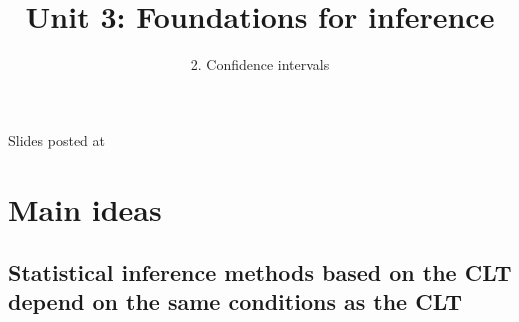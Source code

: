 \documentclass[slidestop,compress,mathserif,11pt,t,professionalfonts,xcolor=table]{beamer}
\title{Unit 3: Foundations for inference}
\subtitle{2. Confidence intervals}
\author{\CourseName}
\date{}
\institute{\InstituteName}
\begin{document}



\begin{frame}[plain]

\titlepage

\vfill

{\scriptsize {} \hfill Slides posted at  \webURL{\CourseSite}}

\addtocounter{framenumber}{-1} 

\end{frame}


%
%
%
%
%
%
%
%


\section{Main ideas}

\subsection{Statistical inference methods based on the CLT depend on the same conditions as the CLT}
\label{mi1}

\end{document}
